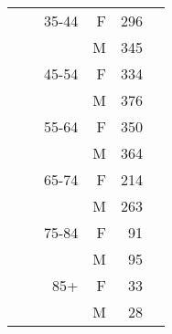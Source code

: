 \begin{tabular}{@{}c@{}rrrr@{}c@{}}
\phantom{.} &                                &  35-44 &  F &     296 &\tabularnewline\relax 
\phantom{.} &                                &        &  M &     345 &\tabularnewline\relax 
\phantom{.} &                                &  45-54 &  F &     334 &\tabularnewline\relax 
\phantom{.} &                                &        &  M &     376 &\tabularnewline\relax 
\phantom{.} &                                &  55-64 &  F &     350 &\tabularnewline\relax 
\phantom{.} &                                &        &  M &     364 &\tabularnewline\relax 
\phantom{.} &                                &  65-74 &  F &     214 &\tabularnewline\relax 
\phantom{.} &                                &        &  M &     263 &\tabularnewline\relax 
\phantom{.} &                                &  75-84 &  F &      91 &\tabularnewline\relax 
\phantom{.} &                                &        &  M &      95 &\tabularnewline\relax 
\phantom{.} &                                &    85+ &  F &      33 &\tabularnewline\relax 
\phantom{.} &                                &        &  M &      28 & \\
\bottomrule
\end{tabular}

